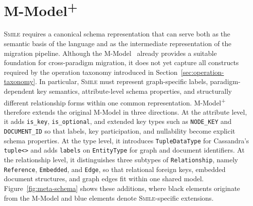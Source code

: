 \documentclass{llncs}
\begin{document}
\section{M-Model\textsuperscript{+}}
\label{sec:unified-meta-schema}

\textsc{Smile} requires a canonical schema representation that can serve both as the semantic basis of the language and as the intermediate representation of the migration pipeline. Although the M-Model~\cite{conrad2022metamodels} already provides a suitable foundation for cross-paradigm migration, it does not yet capture all constructs required by the operation taxonomy introduced in Section~\ref{sec:operation-taxonomy}. In particular, \textsc{Smile} must represent graph-specific labels, paradigm-dependent key semantics, attribute-level schema properties, and structurally different relationship forms within one common representation. M-Model\textsuperscript{+} therefore extends the original M-Model in three directions.
At the attribute level, it adds \texttt{is\_key}, \texttt{is\_optional}, and extended key types such as \texttt{NODE\_KEY} and \texttt{DOCUMENT\_ID} so that labels, key participation, and nullability become explicit schema properties.
At the type level, it introduces \texttt{TupleDataType} for Cassandra's \texttt{tuple<>} and adds \texttt{labels} on \texttt{EntityType} for graph and document identifiers.
At the relationship level, it distinguishes three subtypes of \texttt{Relationship}, namely \texttt{Reference}, \texttt{Embedded}, and \texttt{Edge}, so that relational foreign keys, embedded document structures, and graph edges fit within one shared model.
Figure~\ref{fig:meta-schema} shows these additions, where black elements originate from the M-Model and blue elements denote \textsc{Smile}-specific extensions.
\end{document}
